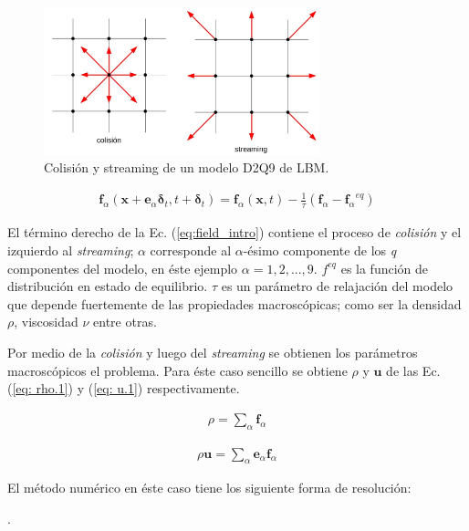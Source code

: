 \begin{figure}[h!]
	\centering
	\includegraphics[width=8cm]{grilla_stre_colli_intro.png}
	\caption{Colisión y streaming de un modelo D2Q9 de LBM.}
	\label{fig:grilla_D2Q9}
\end{figure}


\begin{align}
	\mathbf{f}_{\alpha} (\mathbf{x} + \mathbf{e}_{\alpha} \mathbf{\delta}_{t}, t + \mathbf{\delta}_{t})  = \mathbf{f}_{\alpha} (\mathbf{x}, t) - \frac{1}{\tau} (\mathbf{f}_{\alpha} - {\mathbf{f}_{\alpha}}^{eq})
	\label{eq:field_intro} 
\end{align}

El término derecho de la Ec. (\ref{eq:field_intro}) contiene el proceso de \textit{colisión} y el izquierdo al \textit{streaming}; $\alpha$ corresponde al  $\alpha$-ésimo componente de los \textit{q} componentes del modelo, en éste ejemplo $\alpha = 1, 2, ...,9$. $f^{eq}$ es la función de distribución en estado de equilibrio. $\tau$ es un parámetro de relajación del modelo que depende fuertemente de las propiedades macroscópicas; como ser la densidad $\rho$, viscosidad $\nu$ entre otras.

Por medio de la \textit{colisión} y luego del \textit{streaming} se obtienen los parámetros macroscópicos el problema. Para éste caso sencillo se obtiene $\rho$ y $\mathbf{u}$ de las Ec. (\ref{eq: rho.1}) y (\ref{eq: u.1}) respectivamente.

\begin{align}
	\rho = \sum_{\alpha} \mathbf{f}_{\alpha}
	\label{eq: rho.1}
\end{align}

\begin{align}
	\rho \mathbf{u}= \sum_{\alpha} \mathbf{e}_{\alpha} \mathbf{f}_{\alpha}
	\label{eq: u.1}
\end{align}

El método numérico en éste caso tiene los siguiente forma de resolución:
\newline
{\scriptsize

}
.
\newline 
\newline 

